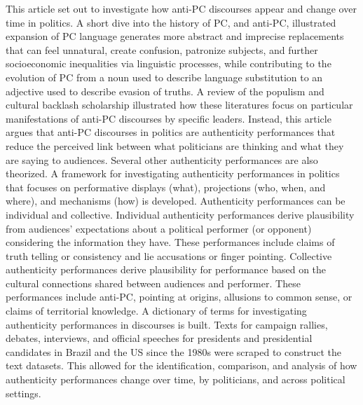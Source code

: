 \documentclass[
  12pt,
]{article}
\begin{document}
This article set out to investigate how anti-PC discourses appear and
change over time in politics. A short dive into the history of PC, and
anti-PC, illustrated expansion of PC language generates more abstract
and imprecise replacements that can feel unnatural, create confusion,
patronize subjects, and further socioeconomic inequalities via
linguistic processes, while contributing to the evolution of PC from a
noun used to describe language substitution to an adjective used to
describe evasion of truths. A review of the populism and cultural
backlash scholarship illustrated how these literatures focus on
particular manifestations of anti-PC discourses by specific leaders.
Instead, this article argues that anti-PC discourses in politics are
authenticity performances that reduce the perceived link between what
politicians are thinking and what they are saying to audiences. Several
other authenticity performances are also theorized. A framework for
investigating authenticity performances in politics that focuses on
performative displays (what), projections (who, when, and where), and
mechanisms (how) is developed. Authenticity performances can be
individual and collective. Individual authenticity performances derive
plausibility from audiences' expectations about a political performer
(or opponent) considering the information they have. These performances
include claims of truth telling or consistency and lie accusations or
finger pointing. Collective authenticity performances derive
plausibility for performance based on the cultural connections shared
between audiences and performer. These performances include anti-PC,
pointing at origins, allusions to common sense, or claims of territorial
knowledge. A dictionary of terms for investigating authenticity
performances in discourses is built. Texts for campaign rallies,
debates, interviews, and official speeches for presidents and
presidential candidates in Brazil and the US since the 1980s were
scraped to construct the text datasets. This allowed for the
identification, comparison, and analysis of how authenticity
performances change over time, by politicians, and across political
settings.
\end{document}
